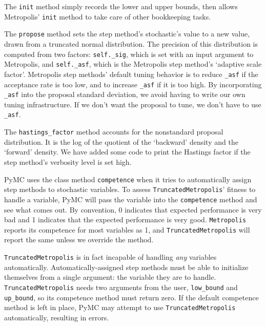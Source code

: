 The \texttt{init} method simply records the lower and upper bounds, then allows Metropolis' \texttt{init} method to take care of other bookkeeping tasks. 

The \texttt{propose} method sets the step method's stochastic's value to a new value, drawn from a truncated normal distribution. The precision of this distribution is computed from two factors: \texttt{self._sig}, which is set with an input argument to Metropolis, and \texttt{self._asf}, which is the Metropolis step method's `adaptive scale factor'. Metropolis step methods' default tuning behavior is to reduce \texttt{_asf} if the acceptance rate is too low, and to increase \texttt{_asf} if it is too high. By incorporating \texttt{_asf} into the proposal standard deviation, we avoid having to write our own tuning infrastructure. If we don't want the proposal to tune, we don't have to use \texttt{_asf}.

The \texttt{hastings_factor} method accounts for the nonstandard proposal distribution. It is the log of the quotient of the `backward' density and the `forward' density. We have added some code to print the Hastings factor if the step method's verbosity level is set high.

PyMC uses the class method \texttt{competence} when it tries to automatically assign step methods to stochastic variables. To assess \texttt{TruncatedMetropolis}' fitness to handle a variable, PyMC will pass the variable into the \texttt{competence} method and see what comes out. By convention, 0 indicates that expected performance is very bad and 1 indicates that the expected performance is very good. \texttt{Metropolis} reports its competence for most variables as 1, and \texttt{TruncatedMetropolis} will report the same unless we override the method. 

\texttt{TruncatedMetropolis} is in fact incapable of handling \emph{any} variables automatically. Automatically-assigned step methods must be able to initialize themselves from a single argument: the variable they are to handle. \texttt{TruncatedMetropolis} needs two arguments from the user, \texttt{low_bound} and \texttt{up_bound}, so its competence method must return zero. If the default competence method is left in place, PyMC may attempt to use \texttt{TruncatedMetropolis} automatically, resulting in errors.

